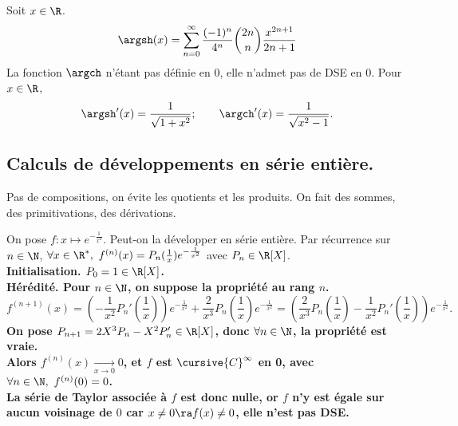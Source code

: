 \documentclass[11pt]{article}
\begin{document}
\vspace*{-0.8cm}

\begin{prop}{}{}
    Soit $x\in\R$.
    \begin{equation*}
        \argsh(x) = \sum_{n=0}^\infty\frac{(-1)^n}{4^n}\binom{2n}{n}\frac{x^{2n+1}}{2n+1}
    \end{equation*}
    La fonction $\argch$ n'étant pas définie en 0, elle n'admet pas de DSE en 0.
    \tcblower
    Pour $x\in\R$,
    \begin{equation*}
        \argsh'(x) = \frac{1}{\sqrt{1+x^2}}; \qquad \argch'(x) = \frac{1}{\sqrt{x^2-1}}.
    \end{equation*}
\end{prop}

\vspace*{-0.8cm}

\subsection{Calculs de développements en série entière.}

Pas de compositions, on évite les quotients et les produits. On fait des sommes, des primitivations, des dérivations.

\begin{ex}{}{}
    On pose $f:x\mapsto e^{-\frac{1}{x^2}}$. Peut-on la développer en série entière.
    \tcblower
    Par récurrence sur $n\in\N$, $\forall x \in \R^*, ~ f^{(n)}(x)=P_n(\frac{1}{x})e^{-\frac{1}{x^2}}$ avec $P_n\in\R[X]$.\\
    \bf{Initialisation.} $P_0=1\in\R[X]$.\\
    \bf{Hérédité.} Pour $n\in\N$, on suppose la propriété au rang $n$.
    \begin{equation*}
        f^{(n+1)}(x)=\left( -\frac{1}{x^2}P_n'\left(\frac{1}{x}\right) \right)e^{-\frac{1}{x^2}} + \frac{2}{x^3}P_n\left( \frac{1}{x} \right)e^{-\frac{1}{x^2}}=\left( \frac{2}{x^3}P_n\left( \frac{1}{x} \right) - \frac{1}{x^2}P_n'\left( \frac{1}{x} \right) \right)e^{-\frac{1}{x^2}}.
    \end{equation*}
    On pose $P_{n+1}=2X^3P_n - X^2P_n' \in \R[X]$, donc $\forall n \in \N$, la propriété est vraie.\\
    Alors $f^{(n)}(x)\xrightarrow[x\to0]{}0$, et $f$ est $\cursive{C}^\infty$ en 0, avec $\forall n \in \N, ~ f^{(n)}(0)=0$.\\
    La série de Taylor associée à $f$ est donc nulle, or $f$ n'y est égale sur aucun voisinage de $0$ car $x\neq0\ra f(x)\neq0$, elle n'est pas DSE.
\end{ex}
\end{document}
